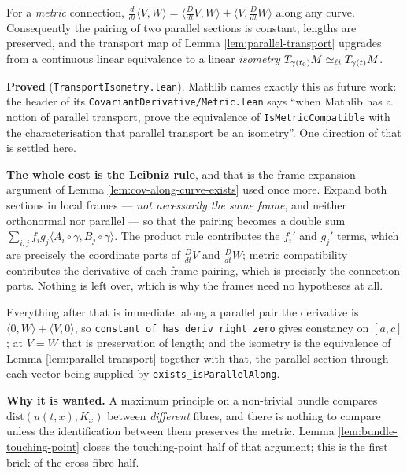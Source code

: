 \begin{lemma}
  \label{lem:transport-isometry}
  \leanok
  For a \emph{metric} connection, $\tfrac{d}{dt}\langle V,W\rangle
  = \langle \tfrac{D}{dt}V, W\rangle + \langle V, \tfrac{D}{dt}W\rangle$ along any curve.
  Consequently the pairing of two parallel sections is constant, lengths are preserved, and
  the transport map of Lemma \ref{lem:parallel-transport} upgrades from a continuous linear
  equivalence to a linear \emph{isometry} $T_{\gamma(t_0)}M \simeq_{\ell i}
  T_{\gamma(t)}M$.

  \textbf{Proved} (\texttt{TransportIsometry.lean}). Mathlib names exactly this as future
  work: the header of its \texttt{CovariantDerivative/Metric.lean} says ``when Mathlib has a
  notion of parallel transport, prove the equivalence of \texttt{IsMetricCompatible} with the
  characterisation that parallel transport be an isometry''. One direction of that is settled
  here.

  \textbf{The whole cost is the Leibniz rule}, and that is the frame-expansion argument of
  Lemma \ref{lem:cov-along-curve-exists} used once more. Expand both sections in local frames
  --- \emph{not necessarily the same frame}, and neither orthonormal nor parallel --- so that
  the pairing becomes a double sum $\sum_{i,j} f_i g_j \langle A_i\circ\gamma,
  B_j\circ\gamma\rangle$. The product rule contributes the $f_i'$ and $g_j'$ terms, which are
  precisely the coordinate parts of $\tfrac{D}{dt}V$ and $\tfrac{D}{dt}W$; metric
  compatibility contributes the derivative of each frame pairing, which is precisely the
  connection parts. Nothing is left over, which is why the frames need no hypotheses at all.

  Everything after that is immediate: along a parallel pair the derivative is
  $\langle 0,W\rangle + \langle V,0\rangle$, so
  \texttt{constant\_of\_has\_deriv\_right\_zero} gives constancy on $[a,c]$; at $V = W$
  that is preservation of length; and the isometry is the equivalence of Lemma
  \ref{lem:parallel-transport} together with that, the parallel section through each vector
  being supplied by \texttt{exists\_isParallelAlong}.

  \textbf{Why it is wanted.} A maximum principle on a non-trivial bundle compares
  $\mathrm{dist}(u(t,x),K_x)$ between \emph{different} fibres, and there is nothing to
  compare unless the identification between them preserves the metric. Lemma
  \ref{lem:bundle-touching-point} closes the touching-point half of that argument; this is
  the first brick of the cross-fibre half.
\end{lemma}

